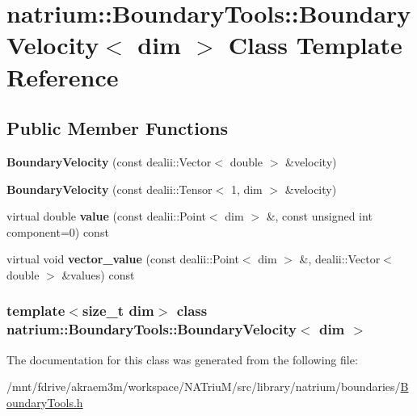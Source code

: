 \hypertarget{classnatrium_1_1BoundaryTools_1_1BoundaryVelocity}{
\section{natrium::BoundaryTools::BoundaryVelocity$<$ dim $>$ Class Template Reference}
\label{classnatrium_1_1BoundaryTools_1_1BoundaryVelocity}
}
\subsection*{Public Member Functions}
\begin{DoxyCompactItemize}
\item 
\hypertarget{classnatrium_1_1BoundaryTools_1_1BoundaryVelocity_a0eb88d154f721f580d113ff7991a6390}{
{\bfseries BoundaryVelocity} (const dealii::Vector$<$ double $>$ \&velocity)}
\label{classnatrium_1_1BoundaryTools_1_1BoundaryVelocity_a0eb88d154f721f580d113ff7991a6390}

\item 
\hypertarget{classnatrium_1_1BoundaryTools_1_1BoundaryVelocity_adda747afd31d025b26124a038d519703}{
{\bfseries BoundaryVelocity} (const dealii::Tensor$<$ 1, dim $>$ \&velocity)}
\label{classnatrium_1_1BoundaryTools_1_1BoundaryVelocity_adda747afd31d025b26124a038d519703}

\item 
\hypertarget{classnatrium_1_1BoundaryTools_1_1BoundaryVelocity_adb91032bfd3559a43aea037c35bbf27a}{
virtual double {\bfseries value} (const dealii::Point$<$ dim $>$ \&, const unsigned int component=0) const }
\label{classnatrium_1_1BoundaryTools_1_1BoundaryVelocity_adb91032bfd3559a43aea037c35bbf27a}

\item 
\hypertarget{classnatrium_1_1BoundaryTools_1_1BoundaryVelocity_a33ffa27bf73b9749af366b9a08631905}{
virtual void {\bfseries vector\_\-value} (const dealii::Point$<$ dim $>$ \&, dealii::Vector$<$ double $>$ \&values) const }
\label{classnatrium_1_1BoundaryTools_1_1BoundaryVelocity_a33ffa27bf73b9749af366b9a08631905}

\end{DoxyCompactItemize}
\subsubsection*{template$<$size\_\-t dim$>$ class natrium::BoundaryTools::BoundaryVelocity$<$ dim $>$}



The documentation for this class was generated from the following file:\begin{DoxyCompactItemize}
\item 
/mnt/fdrive/akraem3m/workspace/NATriuM/src/library/natrium/boundaries/\hyperlink{BoundaryTools_8h}{BoundaryTools.h}\end{DoxyCompactItemize}
